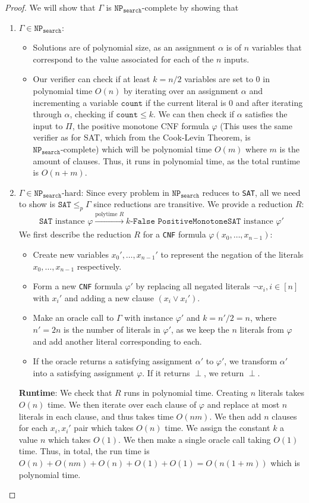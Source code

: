 \documentclass[11pt]{scrartcl}
\theoremstyle{dotlessP}
\theoremstyle{dotlessN}
\newcommand{\np}{\texttt{NP}_\texttt{search}}
\newcommand{\nph}{\texttt{NP}_\texttt{search}\text{-hard}}
\newcommand{\npc}{\texttt{NP}_\texttt{search}\text{-complete}}
\begin{document}
\begin{enumerate}[(a)]
\begin{proof}
			We will show that $\Gamma$ is $\npc$ by showing that
			\begin{enumerate}[1.]
				\item $\Gamma \in \np$: 
\begin{itemize}
	\item Solutions are of polynomial size, as an assignment $\alpha$ is of $n$ variables that correspond to the value associated for each of the $n$ inputs.
	\item Our verifier can check if at least $k = n/2$ variables are set to 0 in polynomial time $O(n)$ by iterating over an assignment $\alpha$ and incrementing a variable $\texttt{count}$ if the current literal is 0 and after iterating through $\alpha$, checking if $\texttt{count} \leq k$. We can then check if $\alpha$ satisfies the input to $\Pi$, the positive monotone CNF formula $\varphi$ (This uses the same verifier as for SAT, which from the Cook-Levin Theorem, is $\npc$) which will be polynomial time $O(m)$ where $m$ is the amount of clauses. Thus, it runs in polynomial time, as the total runtime is $O(n + m)$.
\end{itemize}
\item $\Gamma \in \nph$: Since every problem in $\np$ reduces to \texttt{SAT}, all we need to show is $\texttt{SAT}\leq_p \Gamma$ since reductions are transitive. We provide a reduction $R$:
	\[
	\texttt{SAT} \text{ instance } \varphi \xrightarrow[]{\text{polytime } R}
\texttt{$k$-False PositiveMonotoneSAT} \text{ instance }\varphi'
	\] 
		We first describe the reduction $R$ for a \texttt{CNF} formula $\varphi(x_0, \dots, x_{n-1})$:
		\begin{itemize}
			\item Create new variables $x_0', \dots, x_{n-1}'$ to represent the negation of the literals $x_0, \dots, x_{n-1}$ respectively.
			\item Form a new \texttt{CNF} formula $\varphi'$ by replacing all negated literals $\neg x_i, i \in [n]$ with $x_i'$ and adding a new clause $(x_i \lor x_i')$.
			\item Make an oracle call to $\Gamma$ with instance $\varphi'$ and $k = n'/2 = n$, where $n' = 2n$ is the number of literals in $\varphi'$, as we keep the $n$ literals from $\varphi$ and add another literal corresponding to each.
			\item If the oracle returns a satisfying assignment $\alpha'$ to $\varphi'$, we transform $\alpha'$ into a satisfying assignment $\varphi$. If it returns $\perp$, we return $\perp$.
		\end{itemize}
		\textbf{Runtime}: We check that $R$ runs in polynomial time. Creating $n$ literals takes $O(n)$ time. We then iterate over each clause of $\varphi$ and replace at most $n$ literals in each clause, and thus takes time $O(nm)$. We then add $n$ clauses for each $x_i, x_i'$ pair which takes $O(n)$ time. We assign the constant $k$ a value $n$ which takes $O(1)$. We then make a single oracle call taking $O(1)$ time. Thus, in total, the run time is $O(n) + O(nm) + O(n) + O(1) + O(1) = O(n(1 + m))$ which is polynomial time.


\end{enumerate}
\end{proof}
\end{enumerate}
\end{document}
